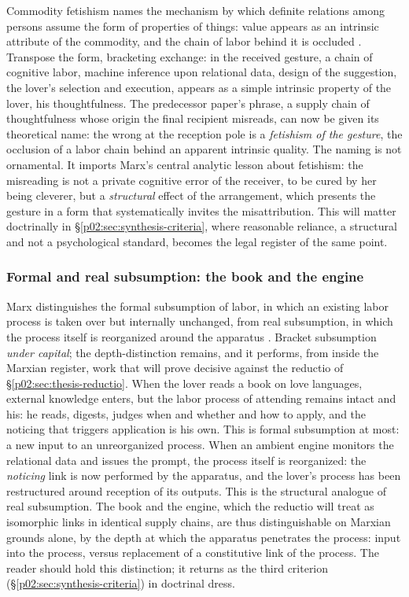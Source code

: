 \documentclass[11pt,a4paper]{article}
\newcommand{\term}[1]{\textit{\textcolor{pinkitalic}{#1}}}
\begin{document}
Commodity fetishism names the mechanism by which definite relations among persons assume the form of properties of things: value appears as an intrinsic attribute of the commodity, and the chain of labor behind it is occluded \parencite{marx1867capital}. Transpose the form, bracketing exchange: in the received gesture, a chain of cognitive labor, machine inference upon relational data, design of the suggestion, the lover's selection and execution, appears as a simple intrinsic property of the lover, his thoughtfulness. The predecessor paper's phrase, a supply chain of thoughtfulness whose origin the final recipient misreads, can now be given its theoretical name: the wrong at the reception pole is a \term{fetishism of the gesture}, the occlusion of a labor chain behind an apparent intrinsic quality. The naming is not ornamental. It imports Marx's central analytic lesson about fetishism: the misreading is not a private cognitive error of the receiver, to be cured by her being cleverer, but a \emph{structural} effect of the arrangement, which presents the gesture in a form that systematically invites the misattribution. This will matter doctrinally in \S\ref{p02:sec:synthesis-criteria}, where reasonable reliance, a structural and not a psychological standard, becomes the legal register of the same point.

\subsubsection{Formal and real subsumption: the book and the engine}
\label{p02:sec:marx-subsumption}

Marx distinguishes the formal subsumption of labor, in which an existing labor process is taken over but internally unchanged, from real subsumption, in which the process itself is reorganized around the apparatus \parencite{marx1864results}. Bracket subsumption \emph{under capital}; the depth-distinction remains, and it performs, from inside the Marxian register, work that will prove decisive against the reductio of \S\ref{p02:sec:thesis-reductio}. When the lover reads a book on love languages, external knowledge enters, but the labor process of attending remains intact and his: he reads, digests, judges when and whether and how to apply, and the noticing that triggers application is his own. This is formal subsumption at most: a new input to an unreorganized process. When an ambient engine monitors the relational data and issues the prompt, the process itself is reorganized: the \emph{noticing} link is now performed by the apparatus, and the lover's process has been restructured around reception of its outputs. This is the structural analogue of real subsumption. The book and the engine, which the reductio will treat as isomorphic links in identical supply chains, are thus distinguishable on Marxian grounds alone, by the depth at which the apparatus penetrates the process: input into the process, versus replacement of a constitutive link of the process. The reader should hold this distinction; it returns as the third criterion (\S\ref{p02:sec:synthesis-criteria}) in doctrinal dress.
\end{document}
